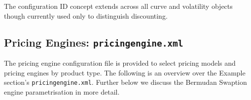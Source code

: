 \documentclass[12pt, a4paper]{article}
\begin{document}
\medskip The configuration ID concept extends across all curve and volatility objects though currently used only to
distinguish discounting.
 
\subsection{Pricing Engines: {\tt pricingengine.xml}}

The pricing engine configuration file is provided to select pricing models and pricing engines by product type. The
following is an overview over the Example section's {\tt pricingengine.xml}. Further below we discuss the Bermudan Swaption engine parametrisation in more detail.
\end{document}
